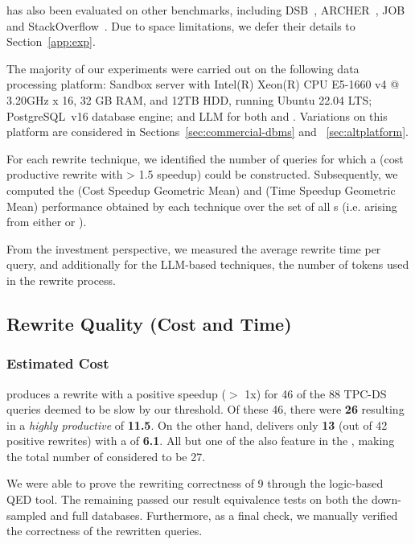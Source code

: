 \lithe has also been evaluated on other benchmarks, including DSB~\cite{DSB}, ARCHER~\cite{ARCHER}, JOB~\cite{JOB} and StackOverflow~\cite{Stackoverflow}. Due to space limitations, we defer their details to Section~\ref{app:exp}.

%
The majority of our experiments were carried out on the following data processing platform: Sandbox server with Intel(R) Xeon(R) CPU E5-1660 v4 @ 3.20GHz x 16, 32 GB RAM, and 12TB HDD, running Ubuntu 22.04 LTS;  PostgreSQL~v16 database engine; and \gpt LLM for both \lithe and \sota. Variations on this platform are considered in Sections~\ref{sec:commercial-dbms} and ~\ref{sec:altplatform}.

For each rewrite technique, we identified the number of queries for which a \cpr (cost productive rewrite with > 1.5 speedup) could be constructed.  Subsequently, we computed the \csgm (Cost Speedup Geometric Mean) and \tsgm (Time Speedup Geometric Mean) performance 
obtained by each technique over the set of all {\cpr}s (i.e. \cprs arising from either \lithe or \sota).

From the investment perspective, we measured the average rewrite time per query, and additionally for the LLM-based techniques, the number of tokens used in the rewrite process.

\subsection{Rewrite Quality (Cost and Time)}
\label{sec:rewrite-perf}

\subsubsection{Estimated Cost}
\label{sec:rewrite-cost}
%

\lithe produces a rewrite with a positive speedup ($>$ 1x) for 46 of the 88 TPC-DS queries deemed to be slow by our threshold. Of these 46, there were \textbf{26} \cprs resulting in a \emph{highly productive} \csgm of \textbf{11.5}. On the other hand, \sota delivers only \textbf{13} \cprs (out of 42 positive rewrites) with a \csgm of \textbf{6.1}. All but one of the \sota \cprs also feature in the \lithe \cprs, making the total number of \cprs considered to be 27. 


We were able to prove the rewriting correctness of 9 \cprs through the logic-based QED tool. The remaining passed our result equivalence tests on both the down-sampled and full databases.
%
Furthermore, as a final check, we manually verified the correctness of the rewritten queries.


